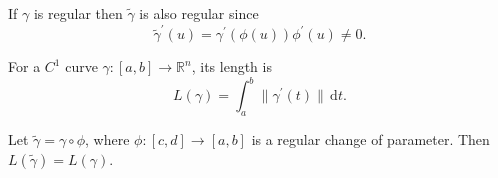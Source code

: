 \begin{remark}
    If \(\gamma \) is regular then \(\widetilde{\gamma} \) is also regular since 
    \[
        \widetilde{\gamma }^{\prime} (u) = \gamma ^{\prime} (\phi (u)) \phi ^{\prime} (u) \neq 0. 
    \]  
\end{remark}

\begin{definition}
    For a \(C^1 \) curve \(\gamma : [a, b] \to \mathbb{R} ^n\), its length is 
    \[
        L(\gamma ) = \int _a^b \lVert \gamma ^{\prime} (t) \rVert \, \mathrm{d} t.  
    \]  
\end{definition}

\begin{proposition}
    Let \(\widetilde{\gamma} = \gamma \circ \phi\), where \(\phi : [c, d] \to [a, b]\) is a regular change of parameter. Then \(L(\widetilde{\gamma} ) = L(\gamma )\).   
\end{proposition}


